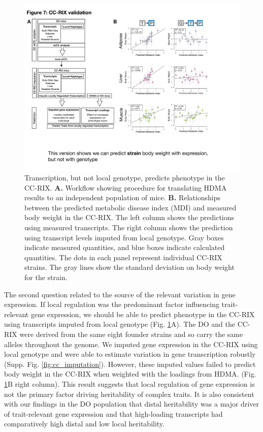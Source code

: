 \documentclass[
]{article}
\begin{document}
\begin{figure}[ht!]
\includegraphics[width=\textwidth]{Figures/Fig7_CC_Prediction.pdf} 
\caption{Transcription, but not local genotype, predicts 
phenotype in the CC-RIX. \textbf{A.} Workflow showing procedure 
for translating HDMA results to an independent population of mice. 
\textbf{B.} Relationships between the predicted metabolic disease
index (MDI) and measured body weight in the CC-RIX. The left column 
shows the predictions using measured transcripts. The right column 
shows the prediction using transcript levels imputed from local 
genotype. Gray boxes indicate measured quantities, and blue boxes 
indicate calculated quantities. The dots in each panel represent 
individual CC-RIX strains. The gray lines show the standard deviation 
on body weight for the strain.
}
\label{fig:cc_prediction}
\end{figure}

The second question related to the source of the relevant variation in
gene expression. If local regulation was the predominant factor
influencing trait-relevant gene expression, we should be able to predict
phenotype in the CC-RIX using transcripts imputed from local genotype
(Fig. \ref{fig:cc_prediction}A). The DO and the CC-RIX were derived from
the same eight founder strains and so carry the same alleles throughout
the genome. We imputed gene expression in the CC-RIX using local
genotype and were able to estimate variation in gene transcription
robustly (Supp. Fig. \ref{fig:cc_imputation}). However, these imputed
values failed to predict body weight in the CC-RIX when weighted with
the loadings from HDMA. (Fig. \ref{fig:cc_prediction}B right column).
This result suggests that local regulation of gene expression is not the
primary factor driving heritability of complex traits. It is also
consistent with our findings in the DO population that distal
heritability was a major driver of trait-relevant gene expression and
that high-loading transcripts had comparatively high distal and low
local heritability.
\end{document}
